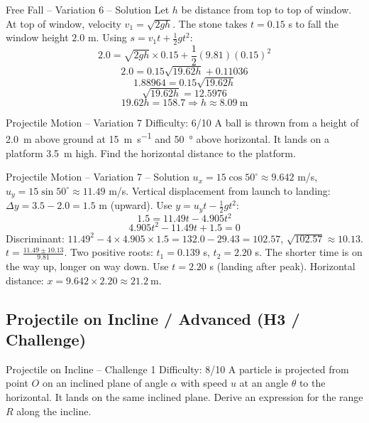 \documentclass{beamer}
\begin{document}
\begin{frame}[shrink=15]{Free Fall – Variation 6 – Solution}
Let $h$ be distance from top to top of window. At top of window, velocity $v_1 = \sqrt{2g h}$. The stone takes $t=0.15$ s to fall the window height $2.0$ m. Using $s = v_1 t + \frac12 g t^2$:
\[ 2.0 = \sqrt{2g h} \times 0.15 + \frac12 (9.81)(0.15)^2 \]
\[ 2.0 = 0.15\sqrt{19.62 h} + 0.11036 \]
\[ 1.88964 = 0.15\sqrt{19.62 h} \]
\[ \sqrt{19.62 h} = 12.5976 \]
\[ 19.62 h = 158.7 \Rightarrow h \approx \SI{8.09}{\meter} \]
\end{frame}

\begin{frame}[t,shrink=15]{Projectile Motion – Variation 7 \hfill Difficulty: 6/10}
A ball is thrown from a height of \SI{2.0}{\m} above ground at \SI{15}{\meter\per\second} and \SI{50}{\degree} above horizontal. It lands on a platform \SI{3.5}{\m} high. Find the horizontal distance to the platform.
\end{frame}

\begin{frame}[shrink=15]{Projectile Motion – Variation 7 – Solution}
$u_x = 15\cos50^\circ \approx 9.642$ m/s, $u_y = 15\sin50^\circ \approx 11.49$ m/s.
Vertical displacement from launch to landing: $\Delta y = 3.5 - 2.0 = 1.5$ m (upward). Use $y = u_y t - \frac12 g t^2$:
\[ 1.5 = 11.49 t - 4.905 t^2 \]
\[ 4.905 t^2 - 11.49 t + 1.5 = 0 \]
Discriminant: $11.49^2 - 4\times4.905\times1.5 = 132.0 - 29.43 = 102.57$, $\sqrt{102.57} \approx 10.13$.
$t = \frac{11.49 \pm 10.13}{9.81}$. Two positive roots: $t_1 = 0.139$ s, $t_2 = 2.20$ s. The shorter time is on the way up, longer on way down. Use $t=2.20$ s (landing after peak).
Horizontal distance: $x = 9.642 \times 2.20 \approx \SI{21.2}{\meter}$.
\end{frame}

\subsection{Projectile on Incline / Advanced (H3 / Challenge)}
\begin{frame}[t,shrink=15]{Projectile on Incline – Challenge 1 \hfill Difficulty: 8/10}
A particle is projected from point $O$ on an inclined plane of angle $\alpha$ with speed $u$ at an angle $\theta$ to the horizontal. It lands on the same inclined plane. Derive an expression for the range $R$ along the incline.
\end{frame}
\end{document}
